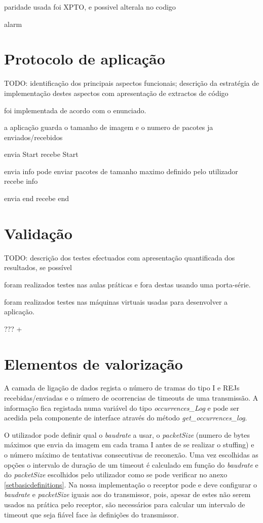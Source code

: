 \documentclass[11pt,a4paper,reqno]{report}
\numberwithin{equation}{section}
\begin{document}
paridade usada foi XPTO, e possivel alterala no codigo

alarm

\chapter{Protocolo de aplicação}

TODO: identificação dos principais aspectos funcionais; descrição da estratégia de implementação destes aspectos com apresentação de extractos de código

foi implementada de acordo com o enunciado.

a aplicação guarda o tamanho de imagem e o numero de pacotes ja enviados/recebidos

envia Start
recebe Start

envia info pode enviar pacotes de tamanho maximo definido pelo utilizador
recebe info

envia end
recebe end


\chapter{Validação}

TODO: descrição dos testes efectuados com apresentação quantificada dos resultados, se possível

foram realizados testes nas aulas práticas e fora destas usando uma porta-série.

foram realizados testes nas máquinas virtuais usadas para desenvolver a aplicação.

??? +


\chapter{Elementos de valorização}

A camada de ligação de dados regista o número de tramas do tipo I e REJs recebidas/enviadas e o número de ocorrencias de timeouts de uma transmissão. A informação fica registada numa variável do tipo {\it occurrences\_Log} e pode ser acedida pela componente de interface através do método {\it get\_occurrences\_log}.

\hfill \break
O utilizador pode definir qual o {\it baudrate} a usar, o {\it packetSize} (numero de bytes máximos que envia da imagem em cada trama I antes de se realizar o stuffing) e o número máximo de tentativas consecutivas de reconexão.
Uma vez escolhidas as opções o intervalo de duração de um timeout é calculado em função do {\it baudrate} e do {\it packetSize} escolhidos pelo utilizador como se pode verificar no anexo \ref{setbasicdefinitions}. Na nossa implementação o receptor pode e deve configurar o {\it baudrate} e {\it packetSize} iguais aos do transmissor, pois, apesar de estes não serem usados na prática pelo receptor, são necessários para calcular um intervalo de timeout que seja fiável face às definições do transmissor.
\end{document}
